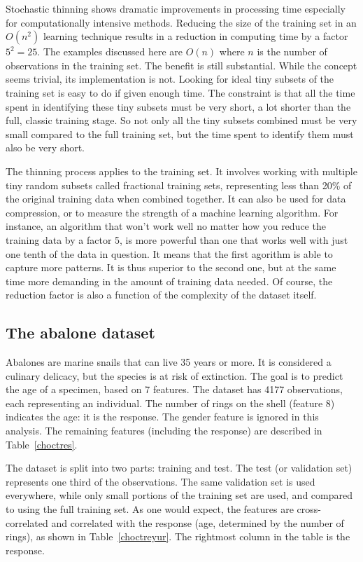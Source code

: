\documentclass[oneside,10pt]{book}
\begin{document}
Stochastic thinning shows dramatic improvements in processing time especially for computationally intensive methods.  Reducing the size
 of the training set in an $O(n^2)$ learning technique results in a reduction in computing time by a factor $5^2 = 25$. The examples discussed here are $O(n)$ where $n$ is the number of observations in the training set. The benefit is still substantial.  While the concept seems trivial, its implementation is not. Looking for ideal tiny subsets of the training set is easy to do if given enough time. The constraint is that all the time spent in identifying these tiny subsets must be very short, a lot shorter than the full, classic training stage. So not only all the
 tiny subsets combined must be very small compared to the full training set, but the time spent to identify them must also be very short.

The thinning process applies to the training set.  It involves working with multiple
 tiny random subsets called \textcolor{index}{fractional training sets}, representing less than 20\% of the original training data when combined together. It can also be used
 for data compression, or to measure the strength of a machine learning algorithm. For instance, an algorithm that won't work well
 no matter how  you reduce the training data by a factor 5, is more powerful than one that works well with just one tenth of the data in question. It means that the first agorithm is able to capture more patterns. It is thus superior to the second one, but at the same time more demanding in the amount of training data needed. Of course, the reduction factor is also a function of the complexity of the dataset itself.

\subsection{The abalone dataset}\label{treszx}

Abalones are marine snails that can live 35 years or more. It is considered a culinary delicacy, but the species is at risk of extinction.
 The goal is to predict the age of a specimen, based on 7 features. The dataset has 4177 observations, each representing an
 individual. The number of rings on the shell (feature 8) indicates the age: it is the response. The gender feature is ignored in this analysis. The remaining features (including the response) are described in Table~\ref{choctres}.



\noindent The dataset is split into two parts: training and test. The test (or validation set) represents one third of the observations. The same validation set is used everywhere, while only small portions of the training set are used, and compared to using the full training set.
As one would expect, the features are cross-correlated and correlated with the response (age, determined by the number of rings), as shown in Table~\ref{choctreyur}. The rightmost column in the table is the response.
\end{document}
